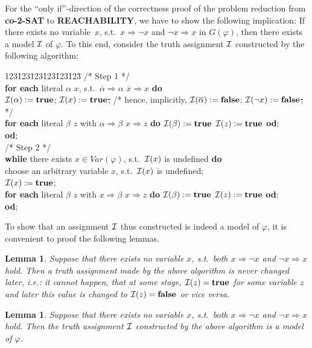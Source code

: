 \documentclass [11pt]{article}
\newtheorem{lemma}[theorem]{Lemma}
\newcommand{\Ra}{\Rightarrow}
\renewcommand{\phi}{\varphi}
\def\II{{\cal I}}
\newcommand{\True}{\mathbf{true}}
\newcommand{\False}{\mathbf{false}}
\def\ox{\neg x}
\def\oa{\overline{\alpha}}
\begin{document}
\noindent
For the ``only if''-direction of the correctness proof of the 
problem reduction from {\bf co-2-SAT}
to {\bf REACHABILITY}, we have to show the following implication: If there exists no 
variable~$x$, s.t.\
$x \Ra  \ox$ and $\ox \Ra x$ in
$G(\phi)$, then there 
exists a model $\II$ of $\phi$.
To this end, consider the truth assignment $\II$ constructed by the following algorithm: 
%
%
\begin{tabbing}
123\=123\=123\=123\=123\=123\=\kill
/* Step 1 */  \\
{\bf for each} literal $\alpha$ \sout{$x$}, s.t.\ $\overline{\alpha} \Ra \alpha$ \sout{$\overline{x} \Ra x$} 
{\bf do} \\
\> $\II(\alpha) := \True$; \sout{$\II(x) := \True$;}
 /* hence, implicitly, $\II(\oa) := \False$; \sout{$\II(\ox) := \False$;} */ \\
\> {\bf for each} literal $\beta$ \sout{$z$} with $\alpha \Ra \beta$ \sout{$x \Ra z$} 
{\bf do}  $\II(\beta) := \True$ \sout{$\II(z) := \True$} {\bf od};
\\
{\bf od}; 
\\[1.1ex]
/* Step 2 */  \\
{\bf while} there exists $x \in Var(\phi)$, s.t.\ $\II(x)$ is undefined
{\bf do} \\
\> choose an arbitrary variable $x$, s.t.\ $\II(x)$ is undefined; \\
\> $\II(x) := \True$;  \\
\> {\bf for each} literal $\beta$ \sout{$z$} with $x \Ra \beta$ \sout{$x \Ra z$}
{\bf do}  $\II(\beta) := \True$ \sout{$\II(z) := \True$} {\bf od};\\
{\bf od};
\end{tabbing}
%
%
To show that an assignment $\II$ thus constructed is indeed a 
model of $\phi$, it is convenient to proof the following lemmas.

\begin{lemma}
\label{lem:1}
Suppose that there exists no
variable $x$, s.t.\ both $x \Ra \ox$ and $\ox \Ra x$ hold.
Then a truth assignment made by the above algorithm is never changed later, i.e.: it cannot happen, that at some stage, 
$\II (z) =\True$ for some variable $z$ and later this value is changed to 
$\II (z) =\False$ or vice versa.
\end{lemma}

\begin{lemma}
\label{lem:2}
Suppose that there exists no
variable $x$, s.t.\ both $x \Ra \ox$ and $\ox \Ra x$ hold.
Then the truth assignment $\II$ constructed by the above algorithm
is a model of $\phi$.
\end{lemma}
\end{document}
